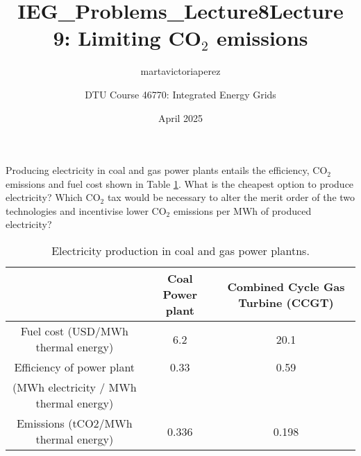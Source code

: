\documentclass[10pt]{article}
\title{IEG_Problems_Lecture8}
\author{martavictoriaperez }
\date{April 2025}
\newenvironment{problem}[2][Problem]{\begin{trivlist}
\item[\hskip \labelsep {\bfseries #1}\hskip \labelsep {\bfseries #2.}]}{\end{trivlist}}
\begin{document}
 
\title{\textbf{Lecture 9: Limiting CO$_2$ emissions}}
\author{
DTU Course 46770: Integrated Energy Grids }
\maketitle

\begin{problem}{9.1}
Producing electricity in coal and gas power plants entails the efficiency, CO$_2$ emissions and fuel cost shown in Table \ref{Tab_coal_gas}. What is the cheapest option to produce electricity? Which CO$_2$ tax would be necessary to alter the merit order of the two technologies and incentivise lower CO$_2$ emissions per MWh of produced electricity?

\begin{table}[h]
    \centering
    \begin{tabular}{|c|c|c|}
        \hline
        & Coal Power plant	&Combined Cycle Gas Turbine (CCGT) \\ \hline
Fuel cost (USD/MWh thermal energy)	& 6.2	& 20.1 \\
Efficiency of power plant &	0.33	& 0.59  \\
(MWh electricity / MWh thermal energy) &	& \\
Emissions (tCO2/MWh thermal energy)	& 0.336	& 0.198 \\
\hline
    \end{tabular}
    \caption{Electricity production in coal and gas power plantns.}
    \label{Tab_coal_gas}
\end{table}
\end{problem}

\
\end{document}
